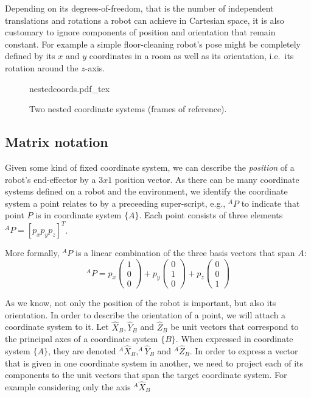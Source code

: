 Depending on its degrees-of-freedom, that is the number of independent translations and rotations a robot can achieve in Cartesian space, it is also customary to ignore components of position and orientation that remain constant. For example a simple floor-cleaning robot's pose might be completely defined by its $x$ and $y$ coordinates in a room as well as its orientation, i.e.\ its rotation around the $z$-axis.

\begin{figure}
    \centering
    \def\svgwidth{\textwidth}
    {nestedcoords.pdf_tex}
    \caption{Two nested coordinate systems (frames of reference).}
    \label{fig:nestedcoords}
\end{figure}

\subsection{Matrix notation}
Given some kind of fixed coordinate system, we can describe the \emph{position} of a robot's end-effector by a $3x1$ position vector. As there can be many coordinate systems defined on a robot and the environment, we identify the coordinate system a point relates to by a preceeding super-script, e.g., $ ^AP$ to indicate that point $P$ is in coordinate system $\{A\}$. Each point consists of three elements $ ^AP=[p_x p_y p_z]^T$.

More formally, $^AP$ is a linear combination of the three basis vectors that span $A$:
\begin{equation}
^AP=p_x\left(\begin{array}{c}1\\0\\0\end{array}\right)+p_y\left(\begin{array}{c}0\\1\\0\end{array}\right)+p_z\left(\begin{array}{c}0\\0\\1\end{array}\right)\label{eq:basis}
\end{equation}

As we know, not only the position of the robot is important, but also its orientation. In order to describe the orientation of a point, we will attach a coordinate system to it. Let $ \hat{X}_B, \hat{Y}_B$ and $ \hat{Z}_B$ be unit vectors that correspond to the principal axes of a coordinate system $\{B\}$. When expressed in coordinate system $\{A\}$, they are denoted $^A\hat{X}_B, ^A\hat{Y}_B$ and $ ^A\hat{Z}_B$. In order to express a vector that is given in one coordinate system in another, we need to project each of its components to the unit vectors that span the target coordinate system. For example considering only the axis $^A\hat{X}_B$

